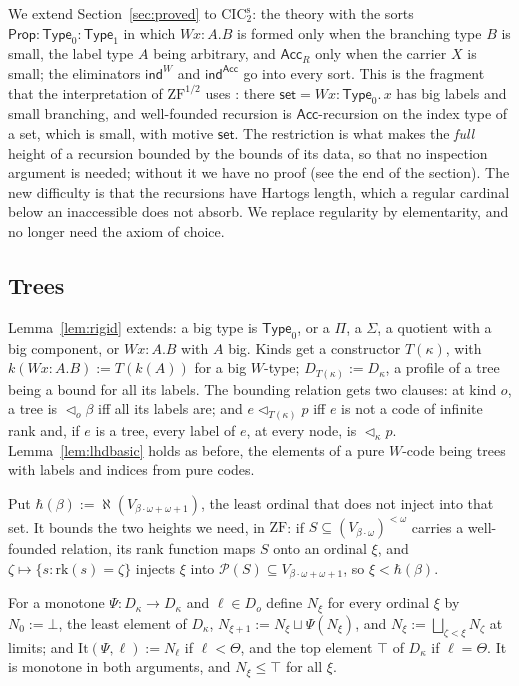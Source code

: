 \documentclass[10pt]{article}
\newcommand{\Prop}{\mathsf{Prop}}
\newcommand{\Type}{\mathsf{Type}}
\newcommand{\CIC}{\mathrm{CIC}}
\newcommand{\ZF}{\mathrm{ZF}}
\newcommand{\ZFh}{\mathrm{ZF}^{1/2}}
\newcommand{\PP}{\mathcal{P}}
\newcommand{\hartogs}{\aleph}
\newcommand{\ind}{\mathsf{ind}}
\newcommand{\Acc}{\mathsf{Acc}}
\begin{document}
We extend Section~\ref{sec:proved} to $\CIC_2^{\mathrm s}$: the theory with
the sorts $\Prop:\Type_0:\Type_1$ in which $Wx{:}A.B$ is formed only when
the branching type $B$ is small, the label type $A$ being arbitrary, and
$\Acc_R$ only when the carrier $X$ is small; the eliminators $\ind^W$ and
$\ind^{\Acc}$ go into every sort. This is the fragment that the
interpretation of $\ZFh$ uses \cite[\S6]{paper2}: there
$\mathsf{set}=Wx{:}\Type_0.\,x$ has big labels and small branching, and
well-founded recursion is $\Acc$-recursion on the index type of a set,
which is small, with motive $\mathsf{set}$. The restriction is what makes
the \emph{full} height of a recursion bounded by the bounds of its data,
so that no inspection argument is needed; without it we have no proof
(see the end of the section). The new difficulty is that the recursions
have Hartogs length, which a regular cardinal below an inaccessible does
not absorb. We replace regularity by elementarity, and no longer need the
axiom of choice.

\subsection{Trees}

Lemma~\ref{lem:rigid} extends: a big type is $\Type_0$, or a $\Pi$, a
$\Sigma$, a quotient with a big component, or $Wx{:}A.B$ with $A$ big.
Kinds get a constructor $T(\kappa)$, with $k(Wx{:}A.B):=T(k(A))$ for a big
$W$-type; $D_{T(\kappa)}:=D_\kappa$, a profile of a tree being a bound for all
its labels. The bounding relation gets two clauses: at kind $o$, a tree
is $\lhd_o\beta$ iff all its labels are; and $e\lhd_{T(\kappa)}p$ iff $e$ is
not a code of infinite rank and, if $e$ is a tree, every label of $e$,
at every node, is $\lhd_\kappa p$. Lemma~\ref{lem:lhdbasic} holds as before,
the elements of a pure $W$-code being trees with labels and indices from
pure codes.

Put $\hbar(\beta):=\hartogs(V_{\beta\cdot\omega+\omega+1})$, the least ordinal that
does not inject into that set. It bounds the two heights we need, in
$\ZF$: if $S\subseteq(V_{\beta\cdot\omega})^{<\omega}$ carries a well-founded
relation, its rank function maps $S$ onto an ordinal $\xi$, and
$\zeta\mapsto\{s:\mathrm{rk}(s)=\zeta\}$ injects $\xi$ into
$\PP(S)\subseteq V_{\beta\cdot\omega+\omega+1}$, so $\xi<\hbar(\beta)$.

\begin{definition}[iteration]\label{def:It}
For a monotone $\Psi:D_\kappa\to D_\kappa$ and $\ell\in D_o$ define
$N_\xi$ for every ordinal $\xi$ by $N_0:=\bot$, the least element of
$D_\kappa$, $N_{\xi+1}:=N_\xi\sqcup\Psi(N_\xi)$, and
$N_\xi:=\bigsqcup_{\zeta<\xi}N_\zeta$ at limits; and
$\mathrm{It}(\Psi,\ell):=N_\ell$ if $\ell<\Theta$, and the top element
$\top$ of $D_\kappa$ if $\ell=\Theta$. It is monotone in both arguments, and
$N_\xi\le\top$ for all $\xi$.
\end{definition}
\end{document}

